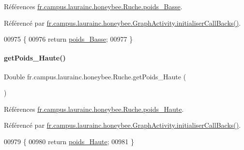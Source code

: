 Références \hyperlink{classfr_1_1campus_1_1laurainc_1_1honeybee_1_1_ruche_ae321c3f7e1f6df6ee69dae4eac5eff1b}{fr.\+campus.\+laurainc.\+honeybee.\+Ruche.\+poids\+\_\+\+Basse}.



Référencé par \hyperlink{classfr_1_1campus_1_1laurainc_1_1honeybee_1_1_graph_activity_a8dc56c3e0744bcb9295ad10e726b5fdb}{fr.\+campus.\+laurainc.\+honeybee.\+Graph\+Activity.\+initialiser\+Call\+Backs()}.


\begin{DoxyCode}
00975                                    \{
00976         \textcolor{keywordflow}{return} \hyperlink{classfr_1_1campus_1_1laurainc_1_1honeybee_1_1_ruche_ae321c3f7e1f6df6ee69dae4eac5eff1b}{poids\_Basse};
00977     \}
\end{DoxyCode}
\mbox{\label{classfr_1_1campus_1_1laurainc_1_1honeybee_1_1_ruche_aba72b70eaa0fd03c6534c22442a7ecea}} 
\paragraph{\texorpdfstring{get\+Poids\+\_\+\+Haute()}{getPoids\_Haute()}}
{\footnotesize\ttfamily Double fr.\+campus.\+laurainc.\+honeybee.\+Ruche.\+get\+Poids\+\_\+\+Haute (\begin{DoxyParamCaption}{ }\end{DoxyParamCaption})}



Références \hyperlink{classfr_1_1campus_1_1laurainc_1_1honeybee_1_1_ruche_a9bfa63b9e5d815d16e07231065f8f31e}{fr.\+campus.\+laurainc.\+honeybee.\+Ruche.\+poids\+\_\+\+Haute}.



Référencé par \hyperlink{classfr_1_1campus_1_1laurainc_1_1honeybee_1_1_graph_activity_a8dc56c3e0744bcb9295ad10e726b5fdb}{fr.\+campus.\+laurainc.\+honeybee.\+Graph\+Activity.\+initialiser\+Call\+Backs()}.


\begin{DoxyCode}
00979                                    \{
00980         \textcolor{keywordflow}{return} \hyperlink{classfr_1_1campus_1_1laurainc_1_1honeybee_1_1_ruche_a9bfa63b9e5d815d16e07231065f8f31e}{poids\_Haute};
00981     \}
\end{DoxyCode}
\mbox{\label{classfr_1_1campus_1_1laurainc_1_1honeybee_1_1_ruche_ae848cc5534cfc05a6db021341f51abba}} 

